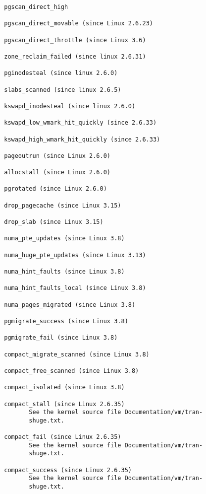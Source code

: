 \documentclass[]{article}
\begin{document}
\begin{verbatim}
              pgscan_direct_high

              pgscan_direct_movable (since Linux 2.6.23)

              pgscan_direct_throttle (since Linux 3.6)

              zone_reclaim_failed (since linux 2.6.31)

              pginodesteal (since linux 2.6.0)

              slabs_scanned (since linux 2.6.5)

              kswapd_inodesteal (since linux 2.6.0)

              kswapd_low_wmark_hit_quickly (since 2.6.33)

              kswapd_high_wmark_hit_quickly (since 2.6.33)

              pageoutrun (since Linux 2.6.0)

              allocstall (since Linux 2.6.0)

              pgrotated (since Linux 2.6.0)

              drop_pagecache (since Linux 3.15)

              drop_slab (since Linux 3.15)

              numa_pte_updates (since Linux 3.8)

              numa_huge_pte_updates (since Linux 3.13)

              numa_hint_faults (since Linux 3.8)

              numa_hint_faults_local (since Linux 3.8)

              numa_pages_migrated (since Linux 3.8)

              pgmigrate_success (since Linux 3.8)

              pgmigrate_fail (since Linux 3.8)

              compact_migrate_scanned (since Linux 3.8)

              compact_free_scanned (since Linux 3.8)

              compact_isolated (since Linux 3.8)

              compact_stall (since Linux 2.6.35)
                     See the kernel source file Documentation/vm/tran‐
                     shuge.txt.

              compact_fail (since Linux 2.6.35)
                     See the kernel source file Documentation/vm/tran‐
                     shuge.txt.

              compact_success (since Linux 2.6.35)
                     See the kernel source file Documentation/vm/tran‐
                     shuge.txt.


\end{verbatim}
\end{document}
